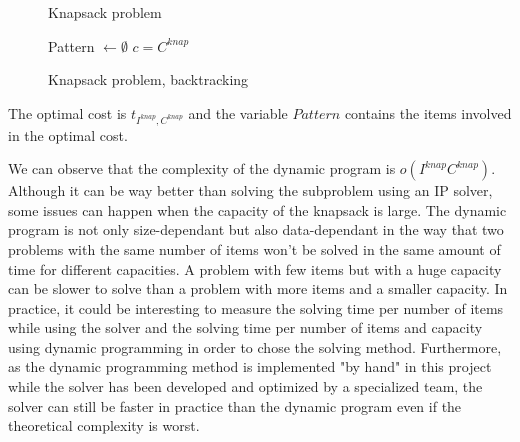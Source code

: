 \begin{figure}[!ht]
	\centering
	\begin{minipage}[t]{0.48\linewidth}
		\begin{algorithm}[H]
			\DontPrintSemicolon 
			\caption{Knapsack problem}
		\end{algorithm}
	\end{minipage}
	\hfill
	\begin{minipage}[t]{0.49\linewidth}
		\begin{algorithm}[H]
			\DontPrintSemicolon 
			Pattern $ \leftarrow \emptyset$\;
			$c = C^{knap}$\;
			\caption{Knapsack problem, backtracking}
		\end{algorithm}
	\end{minipage}
\end{figure}
\newpage

\noindent The optimal cost is $t_{I^{knap}, C^{knap}}$ and the variable $Pattern$ contains the items involved in the optimal cost.

We can observe that the complexity of the dynamic program is $o(I^{knap}C^{knap})$. Although it can be way better than solving the subproblem using an IP solver, some issues can happen when the capacity of the knapsack is large. The dynamic program is not only size-dependant but also data-dependant in the way that two problems with the same number of items won't be solved in the same amount of time for different capacities. A problem with few items but with a huge capacity can be slower to solve than a problem with more items and a smaller capacity. In practice, it could be interesting to measure the solving time per number of items while using the solver and the solving time per number of items and capacity using dynamic programming in order to chose the solving method. Furthermore, as the dynamic programming method is implemented "by hand" in this project while the solver has been developed and optimized by a specialized team, the solver can still be faster in practice than the dynamic program even if the theoretical complexity is worst.